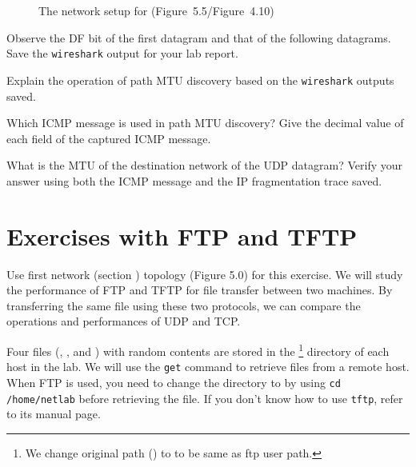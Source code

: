\documentclass{UTNetLab}
\begin{document}
    \begin{figure}[H]
        \centering
        \caption{The network setup for  (Figure~5.5/Figure~4.10)}
        \label{fig:5.5}
    \end{figure}


    Observe the DF bit of the first datagram and that of the following datagrams. Save the \lstinline{wireshark} output for your lab report.

    \begin{report}
    \item Explain the operation of path MTU discovery based on the \lstinline{wireshark} outputs saved.
    
    \item Which ICMP message is used in path MTU discovery? Give the decimal value of each field of the captured ICMP message.
    
    \item What is the MTU of the destination network of the UDP datagram? Verify your answer using both the ICMP message and the IP fragmentation trace saved.
    \end{report}

\part{Exercises with FTP and TFTP}
    Use first network (section ) topology (Figure 5.0) for this exercise.
    We will study the performance of FTP and TFTP for file transfer between two machines.
    By transferring the same file using these two protocols, we can compare the operations and performances of UDP and TCP. 

    Four files (, ,  and ) with random contents are stored in the \footnote{We change original path () to  to be same as ftp user path.} directory of each host in the lab.
    We will use the \lstinline{get} command to retrieve files from a remote host.
    When FTP is used, you need to change the directory to  by using \lstinline{cd /home/netlab} before retrieving the file.
    If you don’t know how to use \lstinline{tftp}, refer to its manual page.
    
\end{document}
